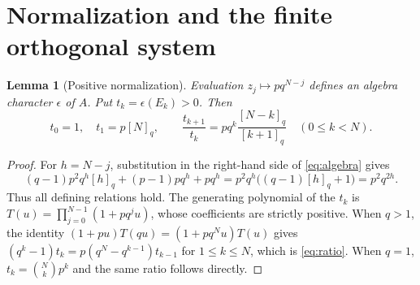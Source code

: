 \documentclass[11pt]{article}
\newtheorem{lemma}[theorem]{Lemma}
\begin{document}
\section{Normalization and the finite orthogonal system}
\begin{lemma}[Positive normalization]\label{lem:normalization}
Evaluation $z_j\mapsto pq^{N-j}$ defines an algebra character $\epsilon$ of $A$. Put $t_k=\epsilon(E_k)>0$. Then
\begin{equation}\label{eq:ratio}
t_0=1,\quad t_1=p[N]_q,\qquad
\frac{t_{k+1}}{t_k}=pq^k\frac{[N-k]_q}{[k+1]_q}\quad(0\leq k<N).
\end{equation}
\end{lemma}
\begin{proof}
For $h=N-j$, substitution in the right-hand side of \eqref{eq:algebra} gives
\[
(q-1)p^2q^h[h]_q+(p-1)pq^h+pq^h
=p^2q^h\big((q-1)[h]_q+1\big)=p^2q^{2h}.
\]
Thus all defining relations hold. The generating polynomial of the $t_k$ is
$T(u)=\prod_{j=0}^{N-1}(1+pq^ju)$, whose coefficients are strictly positive.
When $q>1$, the identity $(1+pu)T(qu)=(1+pq^Nu)T(u)$ gives
$(q^k-1)t_k=p(q^N-q^{k-1})t_{k-1}$ for $1\leq k\leq N$, which is \eqref{eq:ratio}. When $q=1$, $t_k=\binom Nk p^k$ and the same ratio follows directly.
\end{proof}
\end{document}
